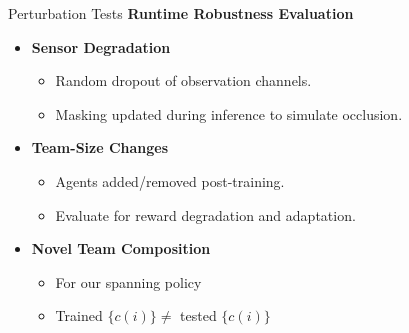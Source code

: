 \begin{frame}{Perturbation Tests}
\textbf{Runtime Robustness Evaluation}
\begin{itemize}
    \item \textbf{Sensor Degradation}
    \begin{itemize}
        \item Random dropout of observation channels.
        \item Masking updated during inference to simulate occlusion.
    \end{itemize}
    \item \textbf{Team-Size Changes}
    \begin{itemize}
        \item Agents added/removed post-training.
        \item Evaluate for reward degradation and adaptation.
    \end{itemize}
    \item \textbf{Novel Team Composition}
    \begin{itemize}
        \item For our spanning policy
        \item Trained \(\{c(i)\}\neq\) tested \(\{c(i)\}\)
    \end{itemize}
\end{itemize}
\end{frame}

